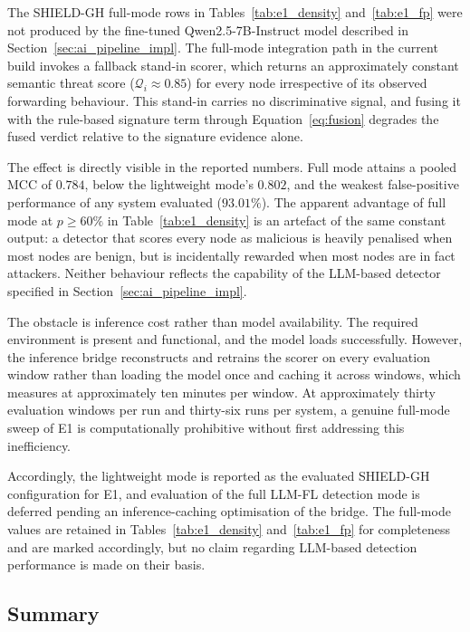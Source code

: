 \documentclass[12pt, a4paper]{report}
\begin{document}
The SHIELD-GH full-mode rows in Tables~\ref{tab:e1_density}
and~\ref{tab:e1_fp} were not produced by the fine-tuned
Qwen2.5-7B-Instruct model described in
Section~\ref{sec:ai_pipeline_impl}. The full-mode integration path in the
current build invokes a fallback stand-in scorer, which returns an
approximately constant semantic threat score
($\mathcal{Q}_i \approx 0.85$) for every node irrespective of its
observed forwarding behaviour. This stand-in carries no discriminative
signal, and fusing it with the rule-based signature term through
Equation~\eqref{eq:fusion} degrades the fused verdict relative to the
signature evidence alone.

The effect is directly visible in the reported numbers. Full mode attains
a pooled MCC of $0.784$, below the lightweight mode's $0.802$, and the
weakest false-positive performance of any system evaluated ($93.01\%$).
The apparent advantage of full mode at $p \geq 60\%$ in
Table~\ref{tab:e1_density} is an artefact of the same constant output: a
detector that scores every node as malicious is heavily penalised when
most nodes are benign, but is incidentally rewarded when most nodes are
in fact attackers. Neither behaviour reflects the capability of the
LLM-based detector specified in Section~\ref{sec:ai_pipeline_impl}.

The obstacle is inference cost rather than model availability. The
required environment is present and functional, and the model loads
successfully. However, the inference bridge reconstructs and retrains the
scorer on every evaluation window rather than loading the model once and
caching it across windows, which measures at approximately ten minutes
per window. At approximately thirty evaluation windows per run and
thirty-six runs per system, a genuine full-mode sweep of E1 is
computationally prohibitive without first addressing this inefficiency.

Accordingly, the lightweight mode is reported as the evaluated SHIELD-GH
configuration for E1, and evaluation of the full LLM-FL detection mode is
deferred pending an inference-caching optimisation of the bridge. The
full-mode values are retained in Tables~\ref{tab:e1_density}
and~\ref{tab:e1_fp} for completeness and are marked accordingly, but no
claim regarding LLM-based detection performance is made on their basis.

\subsection{Summary}
\label{subsec:e1_summary}
\end{document}
